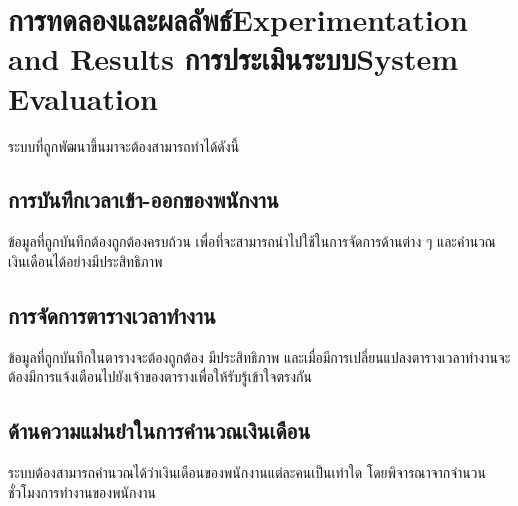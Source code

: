 \chapter{\ifproject%
\ifcpe การทดลองและผลลัพธ์\else Experimentation and Results\fi
\else%
\ifcpe การประเมินระบบ\else System Evaluation\fi
\fi}

ระบบที่ถูกพัฒนาขึ้นมาจะต้องสามารถทำได้ดังนี้ 

\section{การบันทึกเวลาเข้า-ออกของพนักงาน} 
ข้อมูลที่ถูกบันทึกต้องถูกต้องครบถ้วน เพื่อที่จะสามารถนำไปใช้ในการจัดการด้านต่าง ๆ และคำนวณเงินเดือนได้อย่างมีประสิทธิภาพ 

\section{การจัดการตารางเวลาทำงาน}
ข้อมูลที่ถูกบันทึกในตารางจะต้องถูกต้อง มีประสิทธิภาพ และเมื่อมีการเปลี่ยนแปลงตารางเวลาทำงานจะต้องมีการแจ้งเตือนไปยังเจ้าของตารางเพื่อให้รับรู้เข้าใจตรงกัน 

\section{ด้านความแม่นยำในการคำนวณเงินเดือน} 
ระบบต้องสามารถคำนวณได้ว่าเงินเดือนของพนักงานแต่ละคนเป็นเท่าใด โดยพิจารณาจากจำนวนชั่วโมงการทำงานของพนักงาน 
